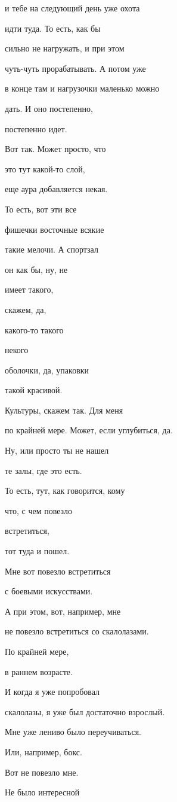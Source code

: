 и тебе на следующий день уже охота

идти туда. То есть, как бы

сильно не нагружать, и при этом

чуть-чуть прорабатывать. А потом уже

в конце там и нагрузочки маленько можно

дать. И оно постепенно,

постепенно идет.

Вот так. Может просто, что

это тут какой-то слой,

еще аура добавляется некая.

То есть, вот эти все

фишечки восточные всякие

такие мелочи. А спортзал

он как бы, ну, не

имеет такого,

скажем, да,

какого-то такого

некого

оболочки, да, упаковки

такой красивой.

Культуры, скажем так. Для меня

по крайней мере. Может, если углубиться, да.

Ну, или просто ты не нашел

те залы, где это есть.

То есть, тут, как говорится, кому

что, с чем повезло

встретиться,

тот туда и пошел.

Мне вот повезло встретиться

с боевыми искусствами.

А при этом, вот, например, мне

не повезло встретиться со скалолазами.

По крайней мере,

в раннем возрасте.

И когда я уже попробовал

скалолазы, я уже был достаточно взрослый.

Мне уже лениво было переучиваться.

Или, например, бокс.

Вот не повезло мне.

Не было интересной

